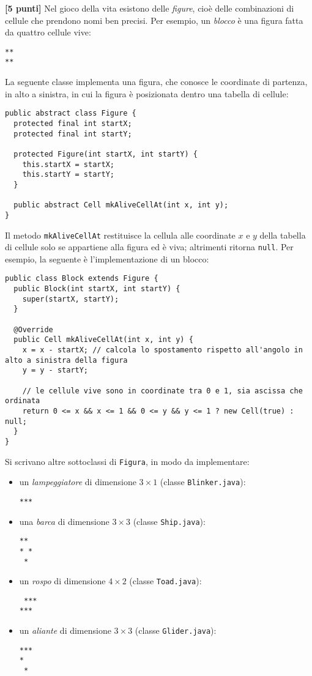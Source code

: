 \documentclass{article}[10pt]
\newcounter{esnu}
\newenvironment{esercizio}{\medskip \noindent {\bf Esercizio\addtocounter{esnu}{1} \arabic{esnu}}}{}
\begin{document}
\begin{esercizio}
\textbf{[5 punti]}
%
Nel gioco della vita esistono delle \emph{figure}, cio\`e
delle combinazioni di cellule che prendono nomi ben precisi. Per
esempio, un \emph{blocco} \`e una figura fatta da quattro cellule vive:

{\small\begin{verbatim}
**
**
\end{verbatim}}

\noindent
La seguente classe implementa una figura, che conosce le coordinate di partenza, in alto a sinistra,
in cui la figura \`e posizionata dentro una tabella di cellule:

{\small\begin{verbatim}
public abstract class Figure {
  protected final int startX;
  protected final int startY;
  
  protected Figure(int startX, int startY) {
    this.startX = startX;
    this.startY = startY;
  }

  public abstract Cell mkAliveCellAt(int x, int y);
}
\end{verbatim}}

\noindent
Il metodo \texttt{mkAliveCellAt} restituisce la cellula alle coordinate $x$ e $y$ della
tabella di cellule solo se appartiene alla figura ed \`e viva; altrimenti ritorna \texttt{null}.
Per esempio, la seguente \`e l'implementazione di un blocco:
%
\newpage
{\small\begin{verbatim}
public class Block extends Figure {
  public Block(int startX, int startY) {
    super(startX, startY);
  }

  @Override
  public Cell mkAliveCellAt(int x, int y) {
    x = x - startX; // calcola lo spostamento rispetto all'angolo in alto a sinistra della figura
    y = y - startY;

    // le cellule vive sono in coordinate tra 0 e 1, sia ascissa che ordinata
    return 0 <= x && x <= 1 && 0 <= y && y <= 1 ? new Cell(true) : null;
  }
}
\end{verbatim}}

Si scrivano altre sottoclassi di \texttt{Figura}, in modo da implementare:
\begin{itemize}
\item un \emph{lampeggiatore} di dimensione $3\times 1$ (classe \texttt{Blinker.java}):
{\small\begin{verbatim}
***
\end{verbatim}}      
\item una \emph{barca} di dimensione $3\times 3$ (classe \texttt{Ship.java}):
{\small\begin{verbatim}
**
* *
 *
\end{verbatim}}
\item un \emph{rospo} di dimensione $4\times 2$ (classe \texttt{Toad.java}):
{\small\begin{verbatim}
 ***
***
\end{verbatim}}
\item un \emph{aliante} di dimensione $3\times 3$ (classe \texttt{Glider.java}):
{\small\begin{verbatim}
***
*
 *
\end{verbatim}}      
\end{itemize}


\end{esercizio}
\end{document}
